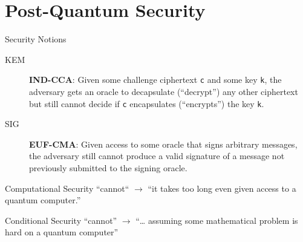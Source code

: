 \documentclass[xcolor=table,10pt,aspectratio=169]{beamer}
\begin{document}
\section{Post-Quantum Security}
\label{sec:org14ed2c0}
\begin{frame}[label={sec:org41c3a13},fragile]{Security Notions}
 \begin{description}
\item[{KEM}] \textbf{IND-CCA}: Given some challenge ciphertext \texttt{c} and some key \texttt{k}, the adversary gets an oracle to decapsulate (“decrypt”) any other ciphertext but still cannot decide if \texttt{c} encapsulates (“encrypts”) the key \texttt{k}.

\item[{SIG}] \textbf{EUF-CMA}: Given access to some oracle that signs arbitrary messages, the adversary still cannot produce a valid signature of a message not previously submitted to the signing oracle.
\end{description}

\pause

\begin{block}{Computational Security}
“cannot“ \(\rightarrow\) “it takes too long even given access to a quantum computer.”


\pause
\end{block}

\begin{block}{Conditional Security}
“cannot” \(\rightarrow\) “… assuming some mathematical problem is hard on a quantum computer”
\end{block}
\end{frame}
\end{document}
